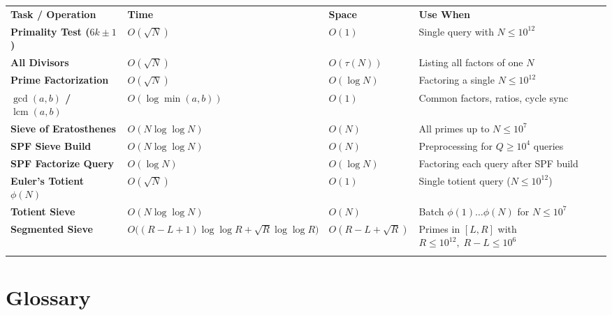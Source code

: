 \documentclass[11pt,a4paper]{article}
\theoremstyle{definition}
\begin{document}
\begingroup\small{}
\begin{tabularx}{\textwidth}{>{\raggedright\arraybackslash\bfseries}p{3.9cm} >{\centering\arraybackslash}p{3.4cm} >{\centering\arraybackslash}p{2.3cm} >{\raggedright\arraybackslash}X}
\arrayrulecolor{primaryblue}\toprule[1.2pt]
\rowcolor{primaryblue!10}
\textcolor{primaryblue}{\textbf{Task / Operation}} & \textcolor{primaryblue}{\textbf{Time}} & \textcolor{primaryblue}{\textbf{Space}} & \textcolor{primaryblue}{\textbf{Use When}} \\
\arrayrulecolor{codeframe}\midrule[0.6pt]
Primality Test ($6k \pm 1$) & $O(\sqrt{N})$ & $O(1)$ & Single query with $N \le 10^{12}$ \\
All Divisors & $O(\sqrt{N})$ & $O(\tau(N))$ & Listing all factors of one $N$ \\
Prime Factorization & $O(\sqrt{N})$ & $O(\log N)$ & Factoring a single $N \le 10^{12}$ \\
$\gcd(a, b)$ / $\operatorname{lcm}(a, b)$ & $O(\log \min(a, b))$ & $O(1)$ & Common factors, ratios, cycle sync \\
Sieve of Eratosthenes & $O(N \log\log N)$ & $O(N)$ & All primes up to $N \le 10^7$ \\
SPF Sieve Build & $O(N \log\log N)$ & $O(N)$ & Preprocessing for $Q \ge 10^4$ queries \\
SPF Factorize Query & $O(\log N)$ & $O(\log N)$ & Factoring each query after SPF build \\
Euler's Totient $\phi(N)$ & $O(\sqrt{N})$ & $O(1)$ & Single totient query ($N \le 10^{12}$) \\
Totient Sieve & $O(N \log\log N)$ & $O(N)$ & Batch $\phi(1) \dots \phi(N)$ for $N \le 10^7$ \\
Segmented Sieve & $O\big((R{-}L{+}1)\log\log R + \sqrt{R}\log\log R\big)$ & $O(R{-}L{+}\sqrt{R})$ & Primes in $[L, R]$ with $R \le 10^{12},\; R{-}L \le 10^6$ \\
\arrayrulecolor{primaryblue}\bottomrule[1.2pt]
\end{tabularx}\endgroup

\section{Glossary}
\end{document}
